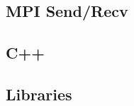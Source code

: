 \subsection{MPI Send/Recv}
\label{sec:mpi-sendrecv}

\begin{frame}{}
  
\end{frame}

\subsection{C++}
\label{sec:c++}

\begin{frame}{}
  
\end{frame}

\subsection{Libraries}
\label{sec:libraries}

\begin{frame}{}
  
\end{frame}








